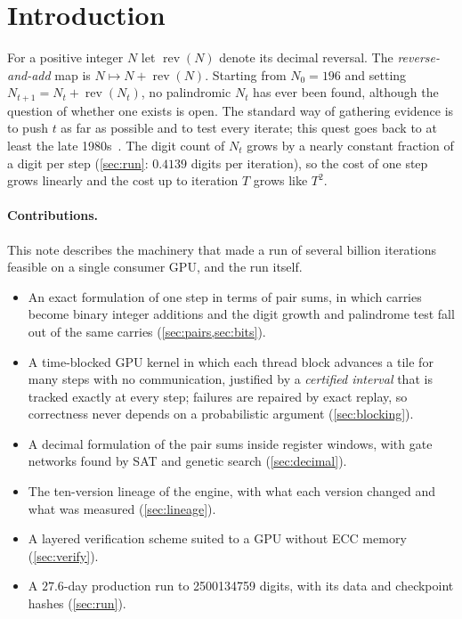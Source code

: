 \documentclass[11pt,a4paper]{article}
\newcommand{\rev}{\operatorname{rev}}
\theoremstyle{remark}
\begin{document}
\section{Introduction}\label{sec:intro}

For a positive integer $N$ let $\rev(N)$ denote its decimal reversal. The \emph{reverse-and-add} map is $N\mapsto N+\rev(N)$. Starting from $N_0=196$ and setting $N_{t+1}=N_t+\rev(N_t)$, no palindromic $N_t$ has ever been found, although the question of whether one exists is open. The standard way of gathering evidence is to push $t$ as far as possible and to test every iterate; this quest goes back to at least the late 1980s~\cite{walker1990,p196org,oeis6960}. The digit count of $N_t$ grows by a nearly constant fraction of a digit per step (\cref{sec:run}: $0.4139$ digits per iteration), so the cost of one step grows linearly and the cost up to iteration $T$ grows like $T^2$.

\paragraph{Contributions.}
This note describes the machinery that made a run of several billion iterations feasible on a single consumer GPU, and the run itself.
\begin{itemize}
\item An exact formulation of one step in terms of pair sums, in which carries become binary integer additions and the digit growth and palindrome test fall out of the same carries (\cref{sec:pairs,sec:bits}).
\item A time-blocked GPU kernel in which each thread block advances a tile for many steps with no communication, justified by a \emph{certified interval} that is tracked exactly at every step; failures are repaired by exact replay, so correctness never depends on a probabilistic argument (\cref{sec:blocking}).
\item A decimal formulation of the pair sums inside register windows, with gate networks found by SAT and genetic search (\cref{sec:decimal}).
\item The ten-version lineage of the engine, with what each version changed and what was measured (\cref{sec:lineage}).
\item A layered verification scheme suited to a GPU without ECC memory (\cref{sec:verify}).
\item A $27.6$-day production run to \num{2500134759} digits, with its data and checkpoint hashes (\cref{sec:run}).
\end{itemize}
\end{document}
